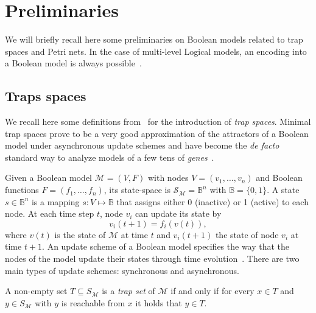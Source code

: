 \documentclass[runningheads]{llncs}
\begin{document}
\section{Preliminaries}

We will briefly recall here some preliminaries on Boolean models related to trap spaces and Petri nets.
In the case of multi-level Logical models, an encoding into a Boolean model is always possible~\cite{Didier2011}.

\subsection{Traps spaces}

We recall here some definitions from~\cite{klarner2015computing} for the introduction of \emph{trap spaces}.
Minimal trap spaces prove to be a very good approximation of the attractors of a Boolean model under asynchronous update schemes and have become the \emph{de facto} standard way to analyze models of a few tens of \emph{genes}~\cite{klarner2017pyboolnet,cifuentes2020control}.

Given a Boolean model \(\mathcal{M} = (V, F)\) with nodes \(V=(v_{1},\dots,v_{n})\) and Boolean functions \(F=(f_{1},\dots,f_{n})\), its state-space is \(\mathcal{S}_{\mathcal{M}} =\mathbb{B}^{n}\) with \(\mathbb{B} = \{0, 1\}\). A state \(s \in \mathbb{B}^{n}\) is a mapping \(s : V \mapsto \mathbb{B}\) that assigns either 0 (inactive) or 1 (active) to each node. At each time step \(t\), node \(v_i\) can update its state by
\[v_i(t + 1) = f_i(v(t)),\] where \(v(t)\) is the state of \(\mathcal{M}\) at time \(t\) and \(v_i(t + 1)\) the state of node \(v_i\) at time \(t + 1\). An update scheme of a Boolean model specifies the way that the nodes of the model update their states through time evolution~\cite{thomas1991regulatory}. There are two main types of update schemes: synchronous and asynchronous.

A non-empty set \(T \subseteq S_{\mathcal{M}}\) is a \emph{trap set} of \(\mathcal{M}\) if and only if for every \(x \in T\) and \(y \in S_{\mathcal{M}}\) with \(y\) is reachable from \(x\) it holds that \(y \in T\).
\end{document}

